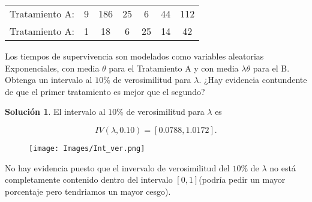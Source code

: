 \documentclass[letterpaper]{article}
\theoremstyle{definition}
\theoremstyle{lemathm}
\theoremstyle{lemathm}
\newtheorem{sol}{Solución}
\theoremstyle{lemathm}
\theoremstyle{lemademthm}
\newcommand{\1}{\mathbbm{1}}
\begin{document}
\begin{enumerate}
		\begin{center}
			\begin{tabular}{ccccccc}
				Tratamiento A: & 9 & 186 & 25 & 6 & 44 & 112\\
				Tratamiento A: & 1 & 18 & 6 & 25 & 14 & 42
			\end{tabular}
		\end{center}
		
		Los tiempos de supervivencia son modelados como variables aleatorias Exponenciales, con media $\theta$ para el Tratamiento A y con media $\lambda\theta$ para el B. Obtenga un intervalo al $10\%$ de verosimilitud para $\lambda$. ¿Hay evidencia contundente de que el primer tratamiento es mejor que el segundo?

		\begin{sol}
			El intervalo al $10\%$ de verosimilitud para $\lambda$ es

			\[IV(\lambda, 0.10) = [0.0788,1.0172].\]

			\begin{figure}[H]
				\begin{center}
					\texttt{[image: Images/Int\_ver.png]}
				\end{center}
			\end{figure}

			No hay evidencia puesto que el invervalo de verosimilitud del $10\%$ de $\lambda$ no está completamente contenido dentro del intervalo $[0,1]$(podría pedir un mayor porcentaje pero tendriamos un mayor cesgo).
		\end{sol}
	\end{enumerate}
\end{document}
